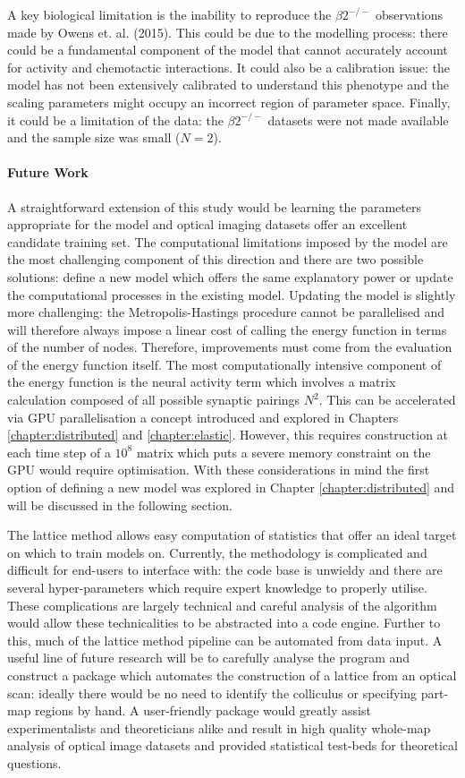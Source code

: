 A key biological limitation is the inability to reproduce the $\beta2^{-/-}$ observations made by Owens et. al. (2015). This could be due to the modelling process: there could be a fundamental component of the model that cannot accurately account for activity and chemotactic interactions. It could also be a calibration issue: the model has not been extensively calibrated to understand this phenotype and the scaling parameters might occupy an incorrect region of parameter space. Finally, it could be a limitation of the data: the $\beta2^{-/-}$ datasets were not made available and the sample size was small ($N=2$). 
\paragraph{Future Work}
A straightforward extension of this study would be learning the parameters appropriate for the model and optical imaging datasets offer an excellent candidate training set. The computational limitations imposed by the model are the most challenging component of this direction and there are two possible solutions: define a new model which offers the same explanatory power or update the computational processes in the existing model. Updating the model is slightly more challenging: the Metropolis-Hastings procedure cannot be parallelised and will therefore always impose a linear cost of calling the energy function in terms of the number of nodes. Therefore, improvements must come from the evaluation of the energy function itself. The most computationally intensive component of the energy function is the neural activity term which involves a matrix calculation composed of all possible synaptic pairings $N^2$. This can be accelerated via GPU parallelisation a concept introduced and explored in Chapters \ref{chapter:distributed} and \ref{chapter:elastic}. However, this requires construction at each time step of a $10^8$ matrix which puts a severe memory constraint on the GPU would require optimisation. With these considerations in mind  the first option of defining a new model was explored in Chapter \ref{chapter:distributed} and will be discussed in the following section. 

The lattice method allows easy computation of statistics that offer an ideal target on which to train models on. Currently, the methodology is complicated and difficult for end-users to interface with: the code base is unwieldy and there are several hyper-parameters which require expert knowledge to properly utilise. These complications are largely technical and careful analysis of the algorithm would allow these technicalities to be abstracted into a code engine. Further to this, much of the lattice method pipeline can be automated from data input. A useful line of future research will be to carefully analyse the program and construct a package which automates the construction of a lattice from an optical scan: ideally there would be no need to identify the colliculus or specifying part-map regions by hand. A user-friendly package would greatly assist experimentalists and theoreticians alike and result in high quality whole-map analysis of optical image datasets and provided statistical test-beds for theoretical questions.
